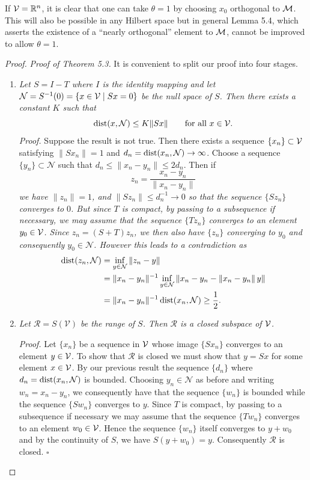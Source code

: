 \begin{remark}
If $\V=\mathbb R^n$, it is clear that one can take $\theta=1$ by choosing $x_0$ orthogonal to $\M$.
This will also be possible in any Hilbert space but in general Lemma 5.4, which asserts the existence of a ``nearly orthogonal'' element to $\M$, cannot be improved to allow $\theta=1$.
\end{remark}

\begin{proof}
\textit{Proof of Theorem 5.3.} \quad It is convenient to split our proof into four stages.

\begin{enumerate}
\item[(1)] \textit{Let $S=I-T$ where $I$ is the identity mapping and let $\mathcal N=S^{-1}(0)=\{x\in\V\mid Sx=0\}$ be the null space of $S$. Then there exists a constant $K$ such that}
\begin{equation}\label{gt.eq5.4}\dcref{(5.4)}\group{chapter-5}\source{gilbarg-trudinger:page-0089}
\dist(x,\mathcal N)\le K\|Sx\| \qquad \text{for all }x\in\V.
\end{equation}
\textit{Proof.} Suppose the result is not true. Then there exists a sequence $\{x_n\}\subset\V$ satisfying $\|Sx_n\|=1$ and $d_n=\dist(x_n,\mathcal N)\to\infty$. Choose a sequence $\{y_n\}\subset\mathcal N$ such that $d_n\le \|x_n-y_n\|\le 2d_n$. Then if
\[
z_n=\frac{x_n-y_n}{\|x_n-y_n\|}
\]
\textit{we have $\|z_n\|=1$, and $\|Sz_n\|\le d_n^{-1}\to0$ so that the sequence $\{Sz_n\}$ converges to $0$. But since $T$ is compact, by passing to a subsequence if necessary, we may assume that the sequence $\{Tz_n\}$ converges to an element $y_0\in\V$. Since $z_n=(S+T)z_n$, we then also have $\{z_n\}$ converging to $y_0$ and consequently $y_0\in\mathcal N$. However this leads to a contradiction as}
\[
\begin{aligned}
\dist(z_n,\mathcal N)
&=\inf_{y\in\mathcal N}\|z_n-y\|\\
&=\|x_n-y_n\|^{-1}\inf_{y\in\mathcal N}\|x_n-y_n-\|x_n-y_n\|\,y\|\\
&=\|x_n-y_n\|^{-1}\dist(x_n,\mathcal N)\ge \frac12.
\end{aligned}
\]

\item[(2)] \textit{Let $\mathcal R=S(\mathcal V)$ be the range of $S$. Then $\mathcal R$ is a closed subspace of $\V$.}

\textit{Proof.} Let $\{x_n\}$ be a sequence in $\V$ whose image $\{Sx_n\}$ converges to an element $y\in\V$. To show that $\mathcal R$ is closed we must show that $y=Sx$ for some element $x\in\V$. By our previous result the sequence $\{d_n\}$ where $d_n=\dist(x_n,\mathcal N)$ is bounded. Choosing $y_n\in\mathcal N$ as before and writing $w_n=x_n-y_n$, we consequently have that the sequence $\{w_n\}$ is bounded while the sequence $\{Sw_n\}$ converges to $y$. Since $T$ is compact, by passing to a subsequence if necessary we may assume that the sequence $\{Tw_n\}$ converges to an element $w_0\in\V$. Hence the sequence $\{w_n\}$ itself converges to $y+w_0$ and by the continuity of $S$, we have $S(y+w_0)=y$. Consequently $\mathcal R$ is closed. $\square$


\end{enumerate}
\end{proof}
